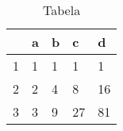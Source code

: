 \begin{table}[]
\centering
\caption{Tabela}
\begin{tabular}{|l|l|l|l|l|}
\hline
  & a & b & c  & d  \\ \hline
1 & 1 & 1 & 1  & 1  \\ \hline
2 & 2 & 4 & 8  & 16 \\ \hline
3 & 3 & 9 & 27 & 81 \\ \hline
\end{tabular}
\label{tab:kkow}
\end{table}